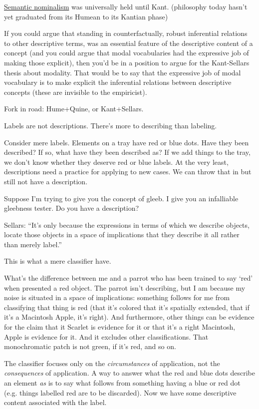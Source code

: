 \href{doc/phil/People/Brandom/On Sellars/2009/Lecture04/Semantic nominalism}{Semantic nominalism} was universally held until Kant. (philosophy today hasn't yet graduated from its Humean to its Kantian phase)

If you could argue that standing in counterfactually, robust inferential relations to other descriptive terms, was an essential feature of the descriptive content of a concept (and you could argue that modal vocabularies had the expressive job of making those explicit), then you'd be in a position to argue for the Kant-Sellars thesis about modality. That would be to say that the expressive job of modal vocabulary is to make explicit the inferential relations between descriptive concepts (these are invisible to the empiricist).

Fork in road: Hume+Quine, or Kant+Sellars.

Labels are not descriptions. There's more to describing than labeling.

Consider mere labels. Elements on a tray have red or blue dots. Have they been described? If so, what have they been described as? If we add things to the tray, we don't know whether they deserve red or blue labels. At the very least, descriptions need a practice for applying to new cases. We can throw that in but still not have a description.

Suppose I'm trying to give you the concept of gleeb. I give you an infalliable gleebness tester. Do you have a description?

Sellars: ``It's only because the expressions in terms of which we describe objects, locate those objects in a space of implications that they describe it all rather than merely label.''

This is what a mere classifier have.

What's the difference between me and a parrot who has been trained to say `red' when presented a red object. The parrot isn't describing, but I am because my noise is situated in a space of implications: something follows for me from classifying that thing is red (that it's colored that it's spatially extended, that if it's a Macintosh Apple, it's right). And furthermore, other things can be evidence for the claim that it Scarlet is evidence for it or that it's a right Macintosh, Apple is evidence for it. And it excludes other classifications. That monochromatic patch is not green, if it's red, and so on.

The classifier focuses only on the \emph{circumstances} of application, not the \emph{consequences} of application. A way to answer what the red and blue dots describe an element \emph{as} is to say what follows from something having a blue or red dot (e.g. things labelled red are to be discarded). Now we have some descriptive content associated with the label.

